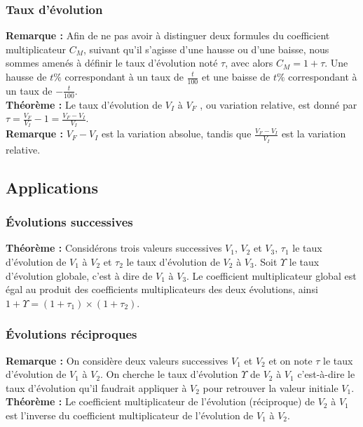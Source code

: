\documentclass[a4paper,titlepage]{article}
\begin{document}
        \subsubsection{Taux d’évolution}
            \textbf{Remarque :} Afin de ne pas avoir à distinguer deux formules du coefficient multiplicateur $C_{M}$, suivant qu’il s’agisse d’une hausse ou d’une baisse, nous sommes amenés à définir le taux d’évolution noté $\tau$, avec alors $C_{M}=1+\tau$. Une hausse de $t\%$ correspondant à un taux de $\frac{t}{100}$ et une baisse de $t\%$ correspondant à un taux de $-\frac{t}{100}$.
            \\
            \textbf{Théorème :} Le taux d’évolution de $V_{I}$ à $V_{F}$ , ou variation relative, est donné par $\tau=\frac{V_{F}}{V_{I}}-1=\frac{V_{F}-V_{I}}{V_{I}}$.
            \\
            \textbf{Remarque :} $V_{F}-V_{I}$ est la variation absolue, tandis que $\frac{V_{F}-V_{I}}{V_{I}}$ est la variation relative.
    \subsection{Applications}
        \subsubsection{Évolutions successives}
            \textbf{Théorème :} Considérons trois valeurs successives $V_{1}$, $V_{2}$ et $V_{3}$, $\tau_{1}$ le taux d’évolution de $V_{1}$ à $V_{2}$ et $\tau_{2}$ le taux d’évolution de $V_{2}$ à $V_{3}$. Soit $\varUpsilon$ le taux d’évolution globale, c’est à dire de $V_{1}$ à $V_{3}$. Le coefficient multiplicateur global est égal au produit des coefficients multiplicateurs des deux évolutions, ainsi\linebreak$1+\varUpsilon=\left(1+\tau_{1}\right)\times\left(1+\tau_{2}\right)$.
        \subsubsection{Évolutions réciproques}
            \textbf{Remarque :} On considère deux valeurs successives $V_{1}$ et $V_{2}$ et on note $\tau$ le taux d’évolution de $V_{1}$ à $V_{2}$. On cherche le taux d’évolution $\varUpsilon$ de $V_{2}$ à $V_{1}$ c’est-à-dire le taux d’évolution qu’il faudrait appliquer à $V_{2}$ pour retrouver la valeur initiale $V_{1}$.
            \\
            \textbf{Théorème :} Le coefficient multiplicateur de l’évolution (réciproque) de $V_{2}$ à $V_{1}$ est l’inverse du coefficient multiplicateur de l’évolution de $V_{1}$ à $V_{2}$.
\null\newpage
{}
\null\newpage
\null\newpage
\null\newpage
\end{document}
